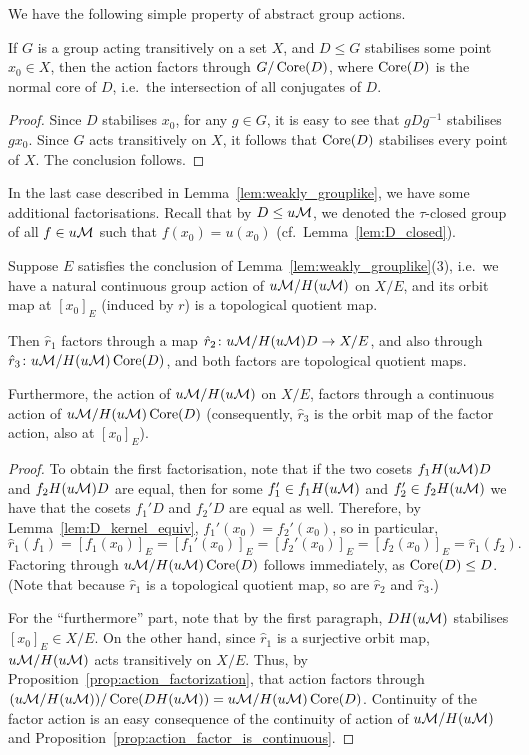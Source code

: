 	We have the following simple property of abstract group actions.
	\begin{prop}
		\label{prop:action_factorization}
		If $G$ is a group acting transitively on a set $X$, and $D\leq G$ stabilises some point $x_0\in X$, then the action factors through $G/\operatorname{{Core}}(D)$, where $\operatorname{{Core}}(D)$ is the normal core of $D$, i.e.\ the intersection of all conjugates of $D$.
	\end{prop}
	\begin{proof}
		Since $D$ stabilises $x_0$, for any $g\in G$, it is easy to see that $gDg^{-1}$ stabilises $gx_0$. Since $G$ acts transitively on $X$, it follows that $\operatorname{{Core}}(D)$ stabilises every point of $X$. The conclusion follows.
	\end{proof}
	
	In the last case described in Lemma~\ref{lem:weakly_grouplike}, we have some additional factorisations. Recall that by $D\leq u{\mathcal M}$, we denoted the $\tau$-closed group of all $f\in u{\mathcal M}$ such that $f(x_0)=u(x_0)$ (cf.\ Lemma~\ref{lem:D_closed}).
	\begin{lem}
		\label{lem:factorisation_lemma}
		Suppose $E$ satisfies the conclusion of Lemma~\ref{lem:weakly_grouplike}(3), i.e.\ we have a natural continuous group action of $u{\mathcal M}/H(u{\mathcal M})$ on $X/E$, and its orbit map at $[x_0]_E$ (induced by $r$) is a topological quotient map.
		
		Then $\hat r_1$ factors through a map $\hat r_2\colon u{\mathcal M}/H(u{\mathcal M})D\to X/E$, and also through $\hat r_3\colon u{\mathcal M}/H(u{\mathcal M})\operatorname{{Core}}(D)$, and both factors are topological quotient maps.
		
		Furthermore, the action of $u{\mathcal M}/H(u{\mathcal M})$ on $X/E$, factors through a continuous action of $u{\mathcal M}/H(u{\mathcal M})\operatorname{{Core}}(D)$ (consequently, $\hat r_3$ is the orbit map of the factor action, also at $[x_0]_E$).
	\end{lem}
	\begin{proof}
		To obtain the first factorisation, note that if the two cosets $f_1H(u{\mathcal M})D$ and $f_2H(u{\mathcal M})D$ are equal, then for some $f_1'\in f_1H(u{\mathcal M})$ and $f_2'\in f_2H(u{\mathcal M})$ we have that the cosets $f_1'D$ and $f_2'D$ are equal as well. Therefore, by Lemma~\ref{lem:D_kernel_equiv}, $f_1'(x_0)=f_2'(x_0)$, so in particular,
		\[
			\hat r_1(f_1)=[f_1(x_0)]_E=[f_1'(x_0)]_E=[f_2'(x_0)]_E=[f_2(x_0)]_E=\hat r_1(f_2).
		\]
		Factoring through $u{\mathcal M}/H(u{\mathcal M})\operatorname{{Core}}(D)$ follows immediately, as $\operatorname{{Core}}(D)\leq D$. (Note that because $\hat r_1$ is a topological quotient map, so are $\hat r_2$ and $\hat r_3$.)
		
		For the ``furthermore'' part, note that by the first paragraph, $DH(u{\mathcal M})$ stabilises $[x_0]_E\in X/E$. On the other hand, since $\hat r_1$ is a surjective orbit map, $u{\mathcal M}/H(u{\mathcal M})$ acts transitively on $X/E$. Thus, by Proposition~\ref{prop:action_factorization}, that action factors through $(u{\mathcal M}/H(u{\mathcal M}))/\operatorname{{Core}}(DH(u{\mathcal M}))=u{\mathcal M}/H(u{\mathcal M})\operatorname{{Core}}(D)$. Continuity of the factor action is an easy consequence of the continuity of action of $u{\mathcal M}/H(u{\mathcal M})$ and Proposition~\ref{prop:action_factor_is_continuous}.
	\end{proof}
	
